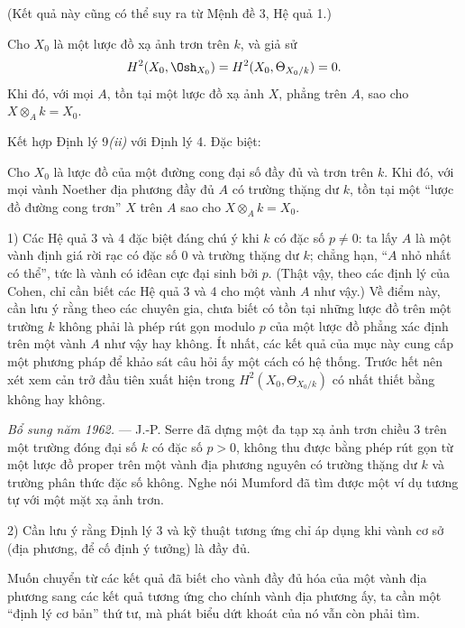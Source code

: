 (Kết quả này cũng có thể suy ra từ Mệnh đề 3, Hệ quả 1.)

 Cho $X_0$ là một lược đồ xạ ảnh trơn trên $k$, và giả sử
\[
  H^2(X_0,\Osh_{X_0})=H^2(X_0,\Theta_{X_0/k})=0.
\]
Khi đó, với mọi $A$, tồn tại một lược đồ xạ ảnh $X$, phẳng trên $A$, sao cho
$X\otimes_A k=X_0$.

Kết hợp Định lý 9\textit{(ii)} với Định lý 4. Đặc biệt:

 Cho $X_0$ là lược đồ của một đường cong đại số đầy đủ và
trơn trên $k$. Khi đó, với mọi vành Noether địa phương đầy đủ $A$ có trường
thặng dư $k$, tồn tại một “lược đồ đường cong trơn” $X$ trên $A$ sao cho
$X\otimes_A k=X_0$.


1) Các Hệ quả 3 và 4 đặc biệt đáng chú ý khi $k$ có đặc số $p\ne0$: ta lấy
$A$ là một vành định giá rời rạc có đặc số $0$ và trường thặng dư $k$; chẳng
hạn, “$A$ nhỏ nhất có thể”, tức là vành có iđêan cực đại sinh bởi $p$. (Thật
vậy, theo các định lý của Cohen, chỉ cần biết các Hệ quả 3 và 4 cho một vành
$A$ như vậy.) Về điểm này, cần lưu ý rằng theo các chuyên gia, chưa biết có
tồn tại những lược đồ trên một trường $k$ không phải là phép rút gọn modulo
$p$ của một lược đồ phẳng xác định trên một vành $A$ như vậy hay không. Ít
nhất, các kết quả của mục này cung cấp một phương pháp để khảo sát câu hỏi ấy
một cách có hệ thống. Trước hết nên xét xem cản trở đầu tiên xuất hiện trong
$H^2(X_0,\Theta_{X_0/k})$ có nhất thiết bằng không hay không.

\emph{Bổ sung năm 1962.} --- J.-P. Serre đã dựng một đa tạp xạ ảnh trơn chiều
3 trên một trường đóng đại số $k$ có đặc số $p>0$, không thu được bằng phép
rút gọn từ một lược đồ proper trên một vành địa phương nguyên có trường thặng
dư $k$ và trường phân thức đặc số không. Nghe nói Mumford đã tìm được một ví
dụ tương tự với một mặt xạ ảnh trơn.

2) Cần lưu ý rằng Định lý 3 và kỹ thuật tương ứng chỉ áp dụng khi vành cơ sở
(địa phương, để cố định ý tưởng) là đầy đủ.

Muốn chuyển từ các kết quả đã biết cho vành đầy đủ hóa của một vành địa phương
sang các kết quả tương ứng cho chính vành địa phương ấy, ta cần một “định lý
cơ bản” thứ tư, mà phát biểu dứt khoát của nó vẫn còn phải tìm.


